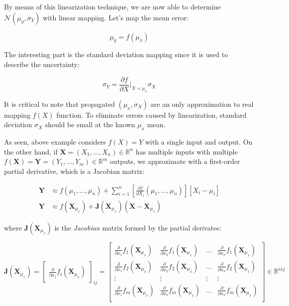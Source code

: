 \documentclass[a4paper]{report}
\numberwithin{figure}{section}
\newcommand{\R}{\mathbb{R}}
\begin{document}
\begin{appendices}
By means of this linearization technique, we are now able to determine 
$\mathcal{N}(\mu_y, \sigma_Y)$ 
with linear mapping. Let's map the mean error:

\begin{equation}
  \mu_y = f(\mu_x)
\end{equation}

The interesting part is the standard deviation mapping since it 
is used to describe the uncertainty:

\begin{equation}
  \sigma_Y = \frac{\partial f}{\partial X}\bigg|_{X=\mu_x} \sigma_X
\end{equation}

It is critical to note that propagated $(\mu_x, \sigma_X)$ are an only 
approximation to real mapping $f(X)$ function. To eliminate errors 
caused by linearization, standard deviation $\sigma_X$ 
should be small at the known $\mu_x$ mean. 

As seen, above example considers $f(X)=Y$ with a single input and output. 
On the other hand, if $\mathbf{X}=(X_1,\dots,X_n) \in \R^n$ has multiple inputs with 
multiple $f(\mathbf{X})=\mathbf{Y}=(Y_1,\dots,Y_m) \in \R^m$ outputs,
we approximate with a first-order partial derivative, which is a Jacobian 
matrix:

\begin{equation}
  \begin{aligned}
    \mathbf{Y} & \approx f(\mu_1,\dots,\mu_n) + 
    \sum_{i=1}^{n} [\frac{\partial f}{\partial X_i}(\mu_1,\dots,\mu_n)][X_i-\mu_i] \\
    \mathbf{Y} & \approx f(\mathbf{X}_{\mu_x}) + \mathbf{J}(\mathbf{X}_{\mu_x}) (\mathbf{X} - \mathbf{X}_{\mu_x})
  \end{aligned}
\end{equation}

where $\mathbf{J}(\mathbf{X}_{\mu_x})$ is the \textit{Jacobian} matrix formed by 
the partial derivates:

\begin{equation}
  \mathbf{J}(\mathbf{X}_{\mu_x}) = \begin{bmatrix} \frac{\partial}{\partial x_j }f_i(\mathbf{X}_{\mu_x}) \end{bmatrix}_{ij} 
  = 
  \begin{bmatrix} 
    \frac{\partial}{\partial x_1}f_1(\mathbf{X}_{\mu_x}) & \frac{\partial}{\partial x_2}f_1(\mathbf{X}_{\mu_x}) & \dots & \frac{\partial}{\partial x_n}f_1(\mathbf{X}_{\mu_x}) \\
    \frac{\partial}{\partial x_1}f_2(\mathbf{X}_{\mu_x}) & \frac{\partial}{\partial x_2}f_2(\mathbf{X}_{\mu_x}) & \dots & \frac{\partial}{\partial x_n}f_2(\mathbf{X}_{\mu_x}) \\
\vdots & \vdots & \vdots & \vdots \\
    \frac{\partial}{\partial x_1}f_m(\mathbf{X}_{\mu_x}) & \frac{\partial}{\partial x_2}f_m(\mathbf{X}_{\mu_x}) & \dots & \frac{\partial}{\partial x_n}f_m(\mathbf{X}_{\mu_x}) \\
  \end{bmatrix}
  \in \R^{ixj}
\end{equation}


\end{appendices}
\end{document}
